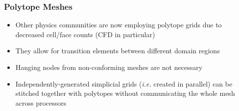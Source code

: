 \documentclass[compress,10pt]{beamer}
\begin{document}
\begin{frame}[t]\frametitle{Polytope Meshes}
         \begin{block}{}{\footnotesize
			\begin{itemize}
				\item <1-> Other physics communities are now employing polytope grids due to decreased cell/face counts (CFD in particular)
				\item <2-> They allow for transition elements between different domain regions
				\item <3-> Hanging nodes from non-conforming meshes are not necessary
				\item <4-> Independently-generated simplicial grids ({\em i.e.} created in parallel) can be stitched together with polytopes without communicating the whole mesh across processors
			\end{itemize}}
         \end{block}
\centering
{}
\end{frame}
\end{document}
